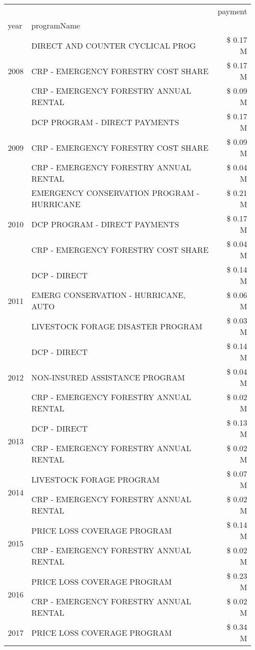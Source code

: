 \begin{tabular}{llr}
\toprule
 &  & payment \\
year & programName &  \\
\midrule
\multirow[t]{3}{*}{2008} & DIRECT AND COUNTER CYCLICAL PROG & \$ 0.17 M \\
 & CRP - EMERGENCY FORESTRY COST SHARE & \$ 0.17 M \\
 & CRP - EMERGENCY FORESTRY ANNUAL RENTAL & \$ 0.09 M \\
\cline{1-3}
\multirow[t]{3}{*}{2009} & DCP PROGRAM - DIRECT PAYMENTS & \$ 0.17 M \\
 & CRP - EMERGENCY FORESTRY COST SHARE & \$ 0.09 M \\
 & CRP - EMERGENCY FORESTRY ANNUAL RENTAL & \$ 0.04 M \\
\cline{1-3}
\multirow[t]{3}{*}{2010} & EMERGENCY CONSERVATION PROGRAM - HURRICANE & \$ 0.21 M \\
 & DCP PROGRAM - DIRECT PAYMENTS & \$ 0.17 M \\
 & CRP - EMERGENCY FORESTRY COST SHARE & \$ 0.04 M \\
\cline{1-3}
\multirow[t]{3}{*}{2011} & DCP - DIRECT & \$ 0.14 M \\
 & EMERG CONSERVATION - HURRICANE, AUTO & \$ 0.06 M \\
 & LIVESTOCK FORAGE DISASTER PROGRAM & \$ 0.03 M \\
\cline{1-3}
\multirow[t]{3}{*}{2012} & DCP - DIRECT & \$ 0.14 M \\
 & NON-INSURED ASSISTANCE PROGRAM & \$ 0.04 M \\
 & CRP - EMERGENCY FORESTRY ANNUAL RENTAL & \$ 0.02 M \\
\cline{1-3}
\multirow[t]{2}{*}{2013} & DCP - DIRECT & \$ 0.13 M \\
 & CRP - EMERGENCY FORESTRY ANNUAL RENTAL & \$ 0.02 M \\
\cline{1-3}
\multirow[t]{2}{*}{2014} & LIVESTOCK FORAGE PROGRAM & \$ 0.07 M \\
 & CRP - EMERGENCY FORESTRY ANNUAL RENTAL & \$ 0.02 M \\
\cline{1-3}
\multirow[t]{2}{*}{2015} & PRICE LOSS COVERAGE PROGRAM & \$ 0.14 M \\
 & CRP - EMERGENCY FORESTRY ANNUAL RENTAL & \$ 0.02 M \\
\cline{1-3}
\multirow[t]{2}{*}{2016} & PRICE LOSS COVERAGE PROGRAM & \$ 0.23 M \\
 & CRP - EMERGENCY FORESTRY ANNUAL RENTAL & \$ 0.02 M \\
\cline{1-3}
\multirow[t]{2}{*}{2017} & PRICE LOSS COVERAGE PROGRAM & \$ 0.34 M \\

\end{tabular}

